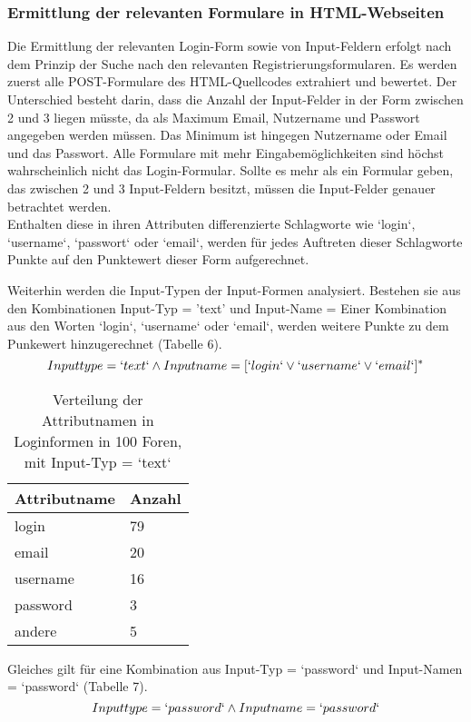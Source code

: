 \subsubsection{Ermittlung der relevanten Formulare in HTML-Webseiten}
Die Ermittlung der relevanten Login-Form sowie von Input-Feldern erfolgt nach dem Prinzip der Suche nach den relevanten Registrierungsformularen. Es werden zuerst alle POST-Formulare des HTML-Quellcodes extrahiert und bewertet. Der Unterschied besteht darin, dass die Anzahl der Input-Felder in der Form zwischen 2 und 3 liegen müsste, da als Maximum Email, Nutzername und Passwort angegeben werden müssen. Das Minimum ist hingegen Nutzername oder Email und das Passwort. Alle Formulare mit mehr Eingabemöglichkeiten sind höchst wahrscheinlich nicht das Login-Formular.
Sollte es mehr als ein Formular geben, das zwischen 2 und 3 Input-Feldern besitzt, müssen die Input-Felder genauer betrachtet werden. \\
Enthalten diese in ihren Attributen differenzierte Schlagworte wie `login`, `username`, `passwort` oder `email`, werden für jedes Auftreten dieser Schlagworte Punkte auf den Punktewert dieser Form aufgerechnet.


Weiterhin werden die Input-Typen der Input-Formen analysiert. Bestehen sie aus den Kombinationen Input-Typ = 'text' und Input-Name = Einer Kombination aus den Worten `login`, `username` oder `email`, werden weitere Punkte zu dem Punkewert hinzugerechnet (Tabelle 6).
\[Inputtype = `text` \wedge Inputname = [`login` \vee `username` \vee `email`]^*\]

\begin{table}[h!]
\centering 
\begin{tabular}{ | p{3cm} | p{3cm}|} \hline
\textbf{Attributname} & \textbf{Anzahl} \\ \hline
login & 79 \\ \hline
email & 20 \\ \hline
username & 16 \\ \hline
password & 3 \\ \hline
andere & 5 \\ \hline
\end{tabular}
\caption{Verteilung der Attributnamen in Loginformen in 100 Foren, mit Input-Typ = `text`}
\end{table}



Gleiches gilt für eine Kombination aus Input-Typ = `password` und Input-Namen = `password` (Tabelle 7).
\[Inputtype = `password` \wedge Inputname = `password`\]

